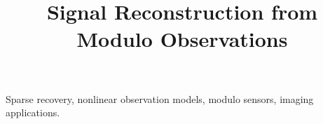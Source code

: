 \documentclass{article}
\title{Signal Reconstruction from Modulo Observations}
\numberwithin{equation}{section}
\begin{document}
	\maketitle
	\ninept
	
	\begin{keywords}
	Sparse recovery, nonlinear observation models, modulo sensors, imaging applications.
	\end{keywords}
	
	
	
%	
	
%	
	{{
	
	
	}
	}	
\end{document}
